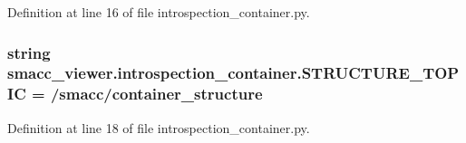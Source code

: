 Definition at line 16 of file introspection\+\_\+container.\+py.

\subsubsection[{\texorpdfstring{S\+T\+R\+U\+C\+T\+U\+R\+E\+\_\+\+T\+O\+P\+IC}{STRUCTURE_TOPIC}}]{\setlength{\rightskip}{0pt plus 5cm}string smacc\+\_\+viewer.\+introspection\+\_\+container.\+S\+T\+R\+U\+C\+T\+U\+R\+E\+\_\+\+T\+O\+P\+IC = \textquotesingle{}/smacc/container\+\_\+structure\textquotesingle{}}\hypertarget{namespacesmacc__viewer_1_1introspection__container_a337acee85dd70b0fff1ed5b256b7a85a}{}\label{namespacesmacc__viewer_1_1introspection__container_a337acee85dd70b0fff1ed5b256b7a85a}


Definition at line 18 of file introspection\+\_\+container.\+py.

